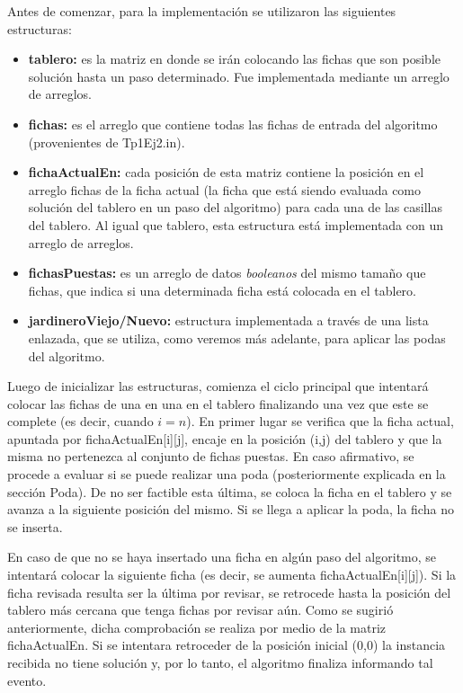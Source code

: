 \documentclass[a4paper,10pt] {article}
\begin{document}
Antes de comenzar, para la implementaci\'on se utilizaron las siguientes estructuras:
\begin{itemize}
 \item \textbf{tablero:} es la matriz en donde se ir\'an colocando las fichas que son posible soluci\'on hasta un paso determinado. Fue implementada mediante un arreglo de arreglos.
\item \textbf{fichas:} es el arreglo que contiene todas las fichas de entrada del algoritmo (provenientes de Tp1Ej2.in).
\item \textbf{fichaActualEn:} cada posici\'on de esta matriz contiene la posici\'on en el arreglo fichas de la ficha actual (la ficha que est\'a siendo evaluada como soluci\'on del tablero en un paso del algoritmo) para cada una de las casillas del tablero. Al igual que tablero, esta estructura est\'a implementada con un arreglo de arreglos.
\item \textbf{fichasPuestas:} es un arreglo de datos \textit{booleanos} del mismo tama\~{n}o que fichas, que indica si una determinada ficha est\'a colocada en el tablero.
\item \textbf{jardineroViejo/Nuevo:} estructura implementada a trav\'es de una lista enlazada, que se utiliza, como veremos m\'as adelante, para aplicar las podas del algoritmo.
\end{itemize}

Luego de inicializar las estructuras, comienza el ciclo principal que intentar\'a colocar las fichas de una en una en el tablero finalizando una vez que este se complete (es decir, cuando $i = n$). En primer lugar se verifica que la ficha actual, apuntada por fichaActualEn[i][j], encaje en la posici\'on (i,j) del tablero y que la misma no pertenezca al conjunto de fichas puestas. En caso afirmativo, se procede a evaluar si se puede realizar una poda (posteriormente explicada en la secci\'on Poda). De no ser factible esta \'ultima, se coloca la ficha en el tablero y se avanza a la siguiente posici\'on del mismo. Si se llega a aplicar la poda, la ficha no se inserta.

En caso de que no se haya insertado una ficha en alg\'un paso del algoritmo, se intentar\'a colocar la siguiente ficha (es decir, se aumenta fichaActualEn[i][j]). Si la ficha revisada resulta ser la \'ultima por revisar, se retrocede hasta la posici\'on del tablero m\'as cercana que tenga fichas por revisar a\'un. Como se sugiri\'o anteriormente, dicha comprobaci\'on se realiza por medio de la matriz fichaActualEn. Si se intentara retroceder de la posici\'on inicial (0,0) la instancia recibida no tiene soluci\'on y, por lo tanto, el algoritmo finaliza informando tal evento.
\end{document}
